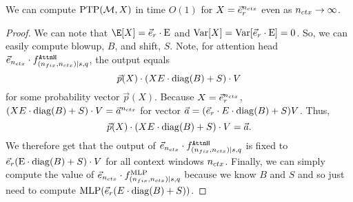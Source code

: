 \begin{lemma}
	\label{lem:gap_shortcut}
	We can compute $\mathrm{PTP}(\mathcal{M}, X)$ in time $O(1)$ for $X=\vec{e}_r^{{n_{ctx}}}$ even as ${n_{ctx}} \rightarrow \infty$.
\end{lemma}
\begin{proof}
	We can note that $\E[X] = \vecDes \cdot \Embed$ and $\mathrm{Var}[X] = \mathrm{Var}[\vec{e}_{r} \cdot \text{E}] = 0$.
	So, we can easily compute blowup, $B$, and shift, $S$.
        Note, for attention head $\vec{e}_{n_{ctx}} \cdot f^{\texttt{AttnH}}_{(n_{fix}, {n_{ctx}}) \mid {s}, q}$, the output equals 
        \[
            \vec{p}(X) \cdot (XE \cdot \mathrm{diag}(B) + S) \cdot V
        \]
        for some probability vector $\vec{p}(X)$.
        Because $X = \vec{e}_r^{n_{ctx}}$, $(XE \cdot \mathrm{diag}(B) + S) \cdot V= \vec{a}^{n_{ctx}}$ for vector $\vec{a} = (\vec{e}_r \cdot E \cdot \mathrm{diag}(B) + S) V$.
        Thus,
        $$
            \vec{p}(X) \cdot (XE \cdot \mathrm{diag}(B) + S) \cdot V = \vec{a}.
        $$
	We therefore get that the output of $\vec{e}_{n_{ctx}} \cdot f^{\texttt{AttnH}}_{(n_{fix}, {n_{ctx}}) \mid {s}, q}$ is fixed to $\vec{e}_r (\text{E} \cdot \mathrm{diag}(B) + S) \cdot V$ for all context windows ${n_{ctx}}$.
	Finally, we can simply compute the value of $\vec{e}_{n_{ctx}} \cdot f^{\text{MLP}}_{(n_{fix}, {n_{ctx}}) \mid {s}, q}$ because we know $B$ and $S$ and so just need to compute $\text{MLP}(\vec{e}_r (E \cdot \mathrm{diag}(B) + S))$.
\end{proof}

